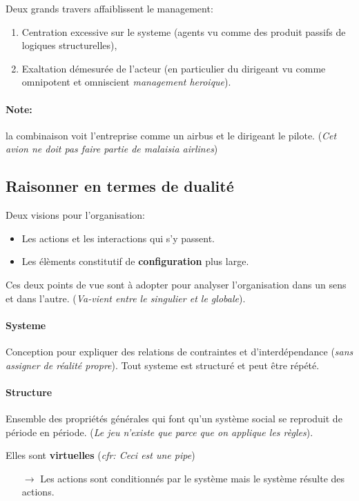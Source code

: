 \documentclass[11pt]{article} %
\begin{document}
Deux grands travers affaiblissent le management:
\begin{enumerate}
\item Centration excessive sur le systeme (agents vu comme des produit passifs de logiques structurelles),
\item Exaltation démesurée de l'acteur (en particulier du dirigeant vu comme omnipotent et omniscient \textit{management heroique}).
\end{enumerate}

\paragraph{Note:} la combinaison voit l'entreprise comme un airbus et le 
dirigeant le pilote. (\textit{Cet avion ne doit pas faire partie de 
malaisia airlines})

\subsection{Raisonner en termes de dualité}
Deux visions pour l'organisation:
\begin{itemize}
	\item Les actions et les interactions qui s'y passent.
    \item Les élèments constitutif de \textbf{configuration} plus large.
\end{itemize}

Ces deux points de vue sont à adopter pour analyser l'organisation dans
un  sens et  dans l'autre.  (\textit{Va-vient entre  le singulier  et le
globale}).

\paragraph{Systeme}   
Conception pour expliquer des relations de contraintes et
d'interdépendance (\textit{sans assigner de réalité propre}). Tout
systeme est structuré et peut être répété.

\paragraph{Structure} 
Ensemble des propriétés générales qui font qu'un système social se
reproduit de période en période. (\textit{Le jeu n'existe que parce
que on applique les règles}).

Elles sont \textbf{virtuelles} (\textit{cfr: Ceci est une pipe})

\begin{itemize}
    \item[$\to$] Les actions sont conditionnés par le système mais le
système résulte des actions.
\end{itemize}
\end{document}
